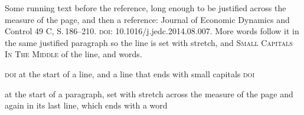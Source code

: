\documentclass[12pt]{report}
\begin{document}
Some running text before the reference, long enough to be justified across the measure of the page,
and then a reference: Journal of Economic Dynamics and Control 49 C, S.\,186--210.
\textsc{doi}: 10.1016/j.jedc.2014.08.007. More words follow it in the same justified paragraph so the line
is set with stretch, and \textsc{Small Capitals In The Middle} of the line, and  words.

\textsc{doi} at the start of a line, and a line that ends with small capitals \textsc{doi}

 at the start of a paragraph, set with stretch across the measure of the page and
again in its last line, which ends with a word 
\end{document}
